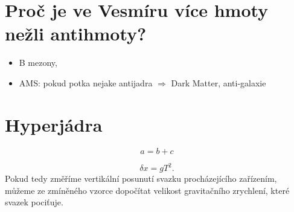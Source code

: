 \documentclass[10pt,a4paper]{article}
\begin{document}

\section*{Proč je ve Vesmíru více hmoty nežli antihmoty?} 

	\begin{itemize}
	\item B mezony,
	\item AMS: pokud potka nejake antijadra $\Rightarrow$ Dark Matter, anti-galaxie
	\end{itemize}



\section*{Hyperjádra}

\begin{equation}
 a = b+c
\end{equation}

$$
	\delta x = g T^2 .
$$
Pokud tedy změříme vertikální posunutí svazku procházejícího zařízením, můžeme ze zmíněného vzorce dopočítat velikost gravitačního zrychlení, které svazek pociťuje.
\end{document}
